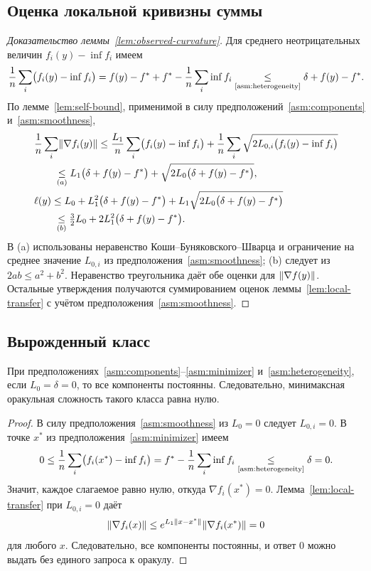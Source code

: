 \subsection{Оценка локальной кривизны суммы}\label{app:observed-curvature}

\begin{proof}[Доказательство леммы~\ref{lem:observed-curvature}]
Для среднего неотрицательных величин $f_i(y)-\inf f_i$ имеем
\[
 \frac1n\sum_i\bigl(f_i(y)-\inf f_i\bigr)
 =f(y)-f^\ast+f^\ast-\frac1n\sum_i\inf f_i
 \mathrel{\underset{\text{\ref{asm:heterogeneity}}}{\le}}\delta+f(y)-f^\ast.
\]
По лемме~\ref{lem:self-bound}, применимой в силу
предположений~\ref{asm:components} и~\ref{asm:smoothness},
\begin{align*}
 &\frac1n\sum_i\lVert\nabla f_i(y)\rVert\le\frac{L_1}n\sum_i\bigl(f_i(y)-\inf f_i\bigr)
 +\frac1n\sum_i\sqrt{2L_{0,i}\bigl(f_i(y)-\inf f_i\bigr)}
 \\&\qquad\mathrel{\underset{(a)}{\le}}
 L_1\bigl(\delta+f(y)-f^\ast\bigr)+\sqrt{2L_0\bigl(\delta+f(y)-f^\ast\bigr)},
 \\
 &\ell(y)\le L_0+L_1^2\bigl(\delta+f(y)-f^\ast\bigr)
 +L_1\sqrt{2L_0\bigl(\delta+f(y)-f^\ast\bigr)}
 \\&\qquad\mathrel{\underset{(b)}{\le}}
 \tfrac32L_0+2L_1^2\bigl(\delta+f(y)-f^\ast\bigr).
\end{align*}
В (a) использованы неравенство Коши--Буняковского--Шварца
и ограничение на среднее значение $L_{0,i}$ из предположения~\ref{asm:smoothness};
(b) следует из $2ab\le a^2+b^2$.
Неравенство треугольника даёт обе оценки для $\lVert\nabla f(y)\rVert$.
Остальные утверждения получаются суммированием оценок
леммы~\ref{lem:local-transfer} с учётом предположения~\ref{asm:smoothness}.
\end{proof}

\subsection{Вырожденный класс}\label{app:degenerate}

\begin{proposition}\label{prop:degenerate-class}
При предположениях~\ref{asm:components}--\ref{asm:minimizer}
и~\ref{asm:heterogeneity}, если $L_0=\delta=0$, то все компоненты постоянны.
Следовательно, минимаксная оракульная сложность такого класса равна нулю.
\end{proposition}

\begin{proof}
В силу предположения~\ref{asm:smoothness} из $L_0=0$ следует
$L_{0,i}=0$. В точке $x^\ast$ из предположения~\ref{asm:minimizer} имеем
\[
 0\le\frac1n\sum_i\bigl(f_i(x^\ast)-\inf f_i\bigr)
 =f^\ast-\frac1n\sum_i\inf f_i\mathrel{\underset{\text{\ref{asm:heterogeneity}}}{\le}}\delta=0.
\]
Значит, каждое слагаемое равно нулю, откуда $\nabla f_i(x^\ast)=0$.
Лемма~\ref{lem:local-transfer} при $L_{0,i}=0$ даёт
\[
 \lVert\nabla f_i(x)\rVert\le e^{L_1\lVert x-x^\ast\rVert}
 \lVert\nabla f_i(x^\ast)\rVert=0
\]
для любого $x$. Следовательно, все компоненты постоянны, и ответ $0$
можно выдать без единого запроса к оракулу.
\end{proof}

